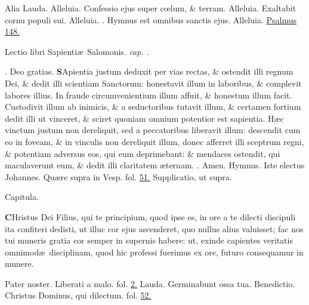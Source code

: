 \documentclass[letter,11pt]{book}
\makeatletter
\DeclareRobustCommand{\Vbar}{\vers@resp{-0.1em}{V}}
\DeclareRobustCommand{\Rbar}{\vers@resp{0pt}{R}}
\newcommand{\vers@resp@sym}{\raisebox{0.2ex}{\rotatebox[origin=c]{-20}{$\m@th\rceil$}}}
\newcommand{\vers@resp}[2]{%
  {\ooalign{\hidewidth\kern#1\vers@resp@sym\hidewidth\cr#2\cr}}%
}%
\def\V{\color{Red} \Vbar . \color{black}}
\def\R{\color{Red} \Rbar . \color{black}}
\makeatother
\begin{document}
\begin{multicols*}{2}
\newline \color{Red} Alia Lauda. \color{black} Alleluia. Confessio ejus super c\oe lum, \& terram. Alleluia. Exaltabit cornu populi sui. Alleluia. \V Hymnus est omnibus sanctis ejus. Alleluia. \color{Red} \hyperlink{ps148}{Psalmus 148.} \color{black}
\vspace{-.5em} \begin{center} {\color{Red} L}ectio libri Sapienti\ae \ Salomonis. \itshape cap. . \color{black} \end{center} \vspace{-.5em}
\par \noindent \R Deo gratias.
\lettrine[lines=2]{\bfseries \color{Red} S}{}Apientia justum deduxit per vias rectas, \& ostendit illi regnum Dei, \& dedit illi scientiam Sanctorum: honestavit illum in laboribus, \& complevit labores illius. In fraude circumvenientium illum affuit, \& honestum illum facit. Custodivit illum ab inimicis, \& a seductoribus tutavit illum, \& certamen fortium dedit illi ut vinceret, \& sciret quoniam omnium potentior est sapientia. H\ae c vinctum justum non dereliquit, sed a peccatoribus liberavit illum: descendit cum eo in foveam, \& in vinculis non dereliquit illum, donec afferret illi sceptrum regni, \& potentiam adversus eos, qui eum deprimebant: \& mendaces ostendit, qui maculaverunt eum, \& dedit illi claritatem \ae ternam. \R Amen.
\newline \color{Red} Hymnus. \color{black} Iste electus Johannes. \color{Red} Qu\ae re supra in Vesp. fol. \color{black} \hyperlink{page.51}{51.} \color{Red} Supplicatio, ut supra. \color{black}
\vspace{-.5em} \begin{center} \color{Red} Capitula. \color{black} \end{center} \vspace{-.5em}
\lettrine[lines=2]{\bfseries \color{Red} C}{}Hristus Dei Filius, qui te principium, quod ipse es, in ore a te dilecti discipuli ita confiteri dedisti, ut illuc cor ejus ascenderet, quo nullus alius valuisset; fac nos tui muneris gratia cor semper in supernis habere: ut, exinde capientes veritatis omnimod\ae \ disciplinam, quod hic professi fuerimus ex ore, futuro consequamur in munere.
\par Pater noster. Liberati a malo. \color{Red} fol. \color{black} \hyperlink{page.2}{2.}
\newline \color{Red} Lauda. \color{black} Germinabunt ossa tua.
\newline \color{Red} Benedictio. \color{black} Christus Dominus, qui dilectum. \color{Red} fol. \color{black} \hyperlink{page.52}{52.}

\end{multicols*}
\end{document}
